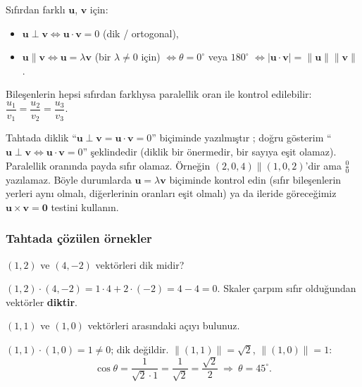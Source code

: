 \begin{teorem}
Sıfırdan farklı $\mathbf u$, $\mathbf v$ için:
\begin{itemize}
\item $\mathbf u\perp\mathbf v\iff\mathbf u\cdot\mathbf v=0$ (dik / ortogonal),
\item $\mathbf u\parallel\mathbf v\iff\mathbf u=\lambda\mathbf v$ (bir $\lambda\neq0$ için) $\iff\theta=0^\circ$ veya $180^\circ$ $\iff |\mathbf u\cdot\mathbf v|=\|\mathbf u\|\|\mathbf v\|$.
\end{itemize}
Bileşenlerin hepsi sıfırdan farklıysa paralellik oran ile kontrol edilebilir: $\dfrac{u_1}{v_1}=\dfrac{u_2}{v_2}=\dfrac{u_3}{v_3}$.
\end{teorem}

\begin{dikkat}
Tahtada diklik ``$\mathbf u\perp\mathbf v=\mathbf u\cdot\mathbf v=0$'' biçiminde yazılmıştır ; doğru gösterim ``$\mathbf u\perp\mathbf v\iff\mathbf u\cdot\mathbf v=0$'' şeklindedir (diklik bir önermedir, bir sayıya eşit olamaz).
Paralellik oranında payda sıfır olamaz. Örneğin $(2,0,4)\parallel(1,0,2)$'dir ama $\frac{0}{0}$ yazılamaz. Böyle durumlarda $\mathbf u=\lambda\mathbf v$ biçiminde kontrol edin (sıfır bileşenlerin yerleri aynı olmalı, diğerlerinin oranları eşit olmalı) ya da ileride göreceğimiz $\mathbf u\times\mathbf v=\mathbf 0$ testini kullanın.
\end{dikkat}

\subsubsection{Tahtada çözülen örnekler}

\begin{soru}
$(1,2)$ ve $(4,-2)$ vektörleri dik midir?
\end{soru}
\begin{cevap}
$(1,2)\cdot(4,-2)=1\cdot4+2\cdot(-2)=4-4=0$. Skaler çarpım sıfır olduğundan vektörler \textbf{diktir}.
\end{cevap}

\begin{soru}
$(1,1)$ ve $(1,0)$ vektörleri arasındaki açıyı bulunuz.
\end{soru}
\begin{cevap}
$(1,1)\cdot(1,0)=1\neq0$; dik değildir. $\|(1,1)\|=\sqrt2$, $\|(1,0)\|=1$:
\[
\cos\theta=\frac{1}{\sqrt2\cdot1}=\frac{1}{\sqrt2}=\frac{\sqrt2}{2}\ \Rightarrow\ \theta=45^\circ .
\]
\end{cevap}

